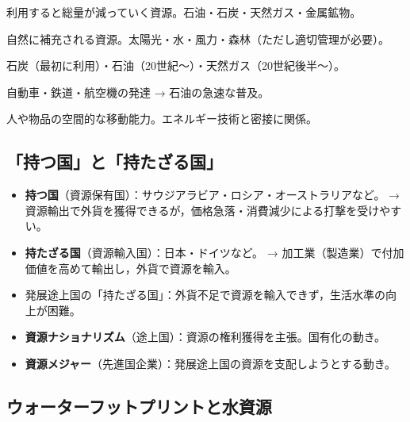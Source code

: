 \documentclass[a4paper,11pt]{article}
\newcommand{\key}[1]{\textbf{\textcolor{mainblue}{#1}}}
\begin{document}
\begin{tcolorbox}[sectionbox, title={■ 資源の分類}]
\begin{description}[leftmargin=3.5cm]
  \item[\key{枯渇性資源}] 利用すると総量が減っていく資源。石油・石炭・天然ガス・金属鉱物。
  \item[\key{再生可能資源}] 自然に補充される資源。太陽光・水・風力・森林（ただし適切管理が必要）。
  \item[\key{化石燃料}] 石炭（最初に利用）・石油（20世紀〜）・天然ガス（20世紀後半〜）。
  \item[\key{エネルギー革命}] 自動車・鉄道・航空機の発達 → 石油の急速な普及。
  \item[\key{モビリティ}] 人や物品の空間的な移動能力。エネルギー技術と密接に関係。
\end{description}
\end{tcolorbox}

\vspace{2mm}

\subsection{「持つ国」と「持たざる国」}

\begin{tcolorbox}[pointbox, title={資源をめぐる国際関係}]
\begin{itemize}[leftmargin=1em]
  \item \key{持つ国}（資源保有国）：サウジアラビア・ロシア・オーストラリアなど。
    → 資源輸出で外貨を獲得できるが，価格急落・消費減少による打撃を受けやすい。
  \item \key{持たざる国}（資源輸入国）：日本・ドイツなど。
    → 加工業（製造業）で付加価値を高めて輸出し，外貨で資源を輸入。
  \item 発展途上国の「持たざる国」：外貨不足で資源を輸入できず，生活水準の向上が困難。
  \item \key{資源ナショナリズム}（途上国）：資源の権利獲得を主張。国有化の動き。
  \item \key{資源メジャー}（先進国企業）：発展途上国の資源を支配しようとする動き。
\end{itemize}
\end{tcolorbox}

\vspace{2mm}

\subsection{ウォーターフットプリントと水資源}
\end{document}
